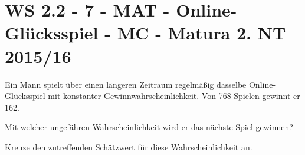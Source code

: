 \section{WS 2.2 - 7 - MAT - Online-Glücksspiel - MC - Matura 2. NT 2015/16}

\begin{beispiel}{1} %
Ein Mann spielt über einen längeren Zeitraum regelmäßig dasselbe Online-Glücksspiel mit konstanter Gewinnwahrscheinlichkeit. Von 768 Spielen gewinnt er 162. \leer

Mit welcher ungefähren Wahrscheinlichkeit wird er das nächste Spiel gewinnen?

Kreuze den zutreffenden Schätzwert für diese Wahrscheinlichkeit an. \leer

\end{beispiel}